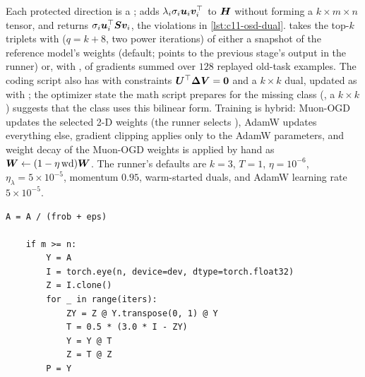 \begin{implnote}[title={In the code: the update path}]
Each protected direction is a ;  adds
$\lambda_i\sigma_i\bm{u}_i\bm{v}_i^{\top}$ to $\bm{H}$ without forming a $k\times m\times n$ tensor, and
 returns $\sigma_i\bm{u}_i^{\top}\bm{S}\bm{v}_i$, the violations in
\cref{lst:c11-osd-dual}.  takes the top-$k$ triplets with
 ($q = k + 8$, two power iterations) of either a snapshot of the
reference model's weights (default;  points to the previous stage's output in
the runner) or, with , of gradients summed over $128$ replayed old-task
examples. The coding script also has  with constraints
$\bm{U}^{\top}\bm{\Delta}\bm{V} = \bm{0}$ and a $k\times k$ dual, updated as
 with ; the optimizer state
the math script prepares for the missing class (, a $k\times k$ )
suggests that the class uses this bilinear form. Training is hybrid: Muon-OGD updates the
selected 2-D weights (the runner selects ), AdamW updates
everything else, gradient clipping applies only to the AdamW parameters, and weight decay of the
Muon-OGD weights is applied by hand as $\bm{W} \leftarrow (1-\eta\,\mathrm{wd})\bm{W}$. The runner's
defaults are $k = 3$, $T = 1$, $\eta = 10^{-6}$, $\eta_\lambda = 5\times10^{-5}$, momentum $0.95$,
warm-started duals, and AdamW learning rate $5\times10^{-5}$.
\end{implnote}


\begin{lstlisting}[caption={Excerpt from \texttt{repos/\allowbreak jeremylu916\_\_OSD/\allowbreak train\_math\_OSD.py} (\texttt{\_polar\_newton\_schulz}, tall case)},label={lst:c11-osd-ns}]
    A = A / (frob + eps)

    if m >= n:
        Y = A
        I = torch.eye(n, device=dev, dtype=torch.float32)
        Z = I.clone()
        for _ in range(iters):
            ZY = Z @ Y.transpose(0, 1) @ Y
            T = 0.5 * (3.0 * I - ZY)
            Y = Y @ T
            Z = T @ Z
        P = Y
\end{lstlisting}

